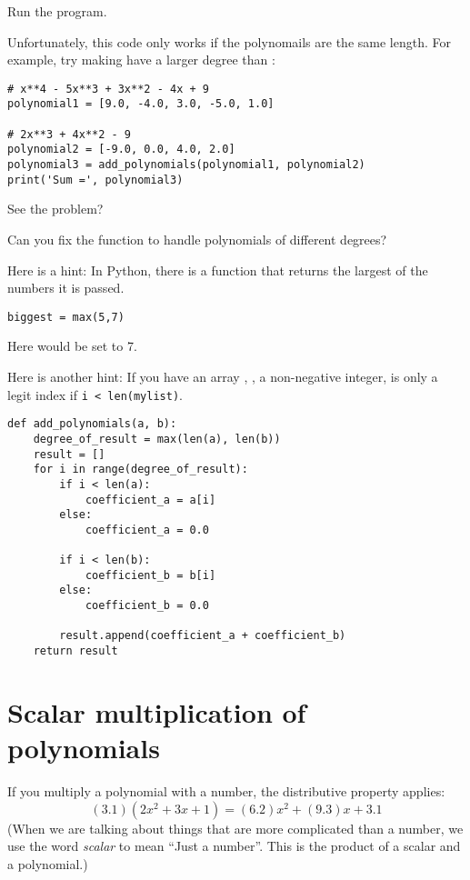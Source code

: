 Run the program.

Unfortunately, this code only works if the polynomails are the same length. For
example, try making  have a larger degree than
:
\begin{Verbatim}
# x**4 - 5x**3 + 3x**2 - 4x + 9
polynomial1 = [9.0, -4.0, 3.0, -5.0, 1.0]
  
# 2x**3 + 4x**2 - 9  
polynomial2 = [-9.0, 0.0, 4.0, 2.0]
polynomial3 = add_polynomials(polynomial1, polynomial2)
print('Sum =', polynomial3)
\end{Verbatim}

See the problem?

\begin{Exercise}[title=Dealing with polynomials of different degrees, label=pyaddpolys]
  
Can you fix the function  to handle polynomials of different degrees?

Here is a hint: In Python, there is a  function that returns the largest of the numbers it is passed.
\begin{Verbatim}
biggest = max(5,7)
\end{Verbatim}
Here  would be set to 7.

Here is another hint: If you have an array , ,
a non-negative integer, is only a legit index if \texttt{i <
  len(mylist)}.
\end{Exercise}
\begin{Answer}[ref=pyaddpolys]
\begin{Verbatim}
def add_polynomials(a, b):
    degree_of_result = max(len(a), len(b))
    result = []
    for i in range(degree_of_result):
        if i < len(a):
            coefficient_a = a[i]
        else:
            coefficient_a = 0.0   

        if i < len(b):
            coefficient_b = b[i]
        else:
            coefficient_b = 0.0
            
        result.append(coefficient_a + coefficient_b)
    return result
\end{Verbatim}
\end{Answer}

\section{Scalar multiplication of  polynomials}

If you multiply a polynomial with a number, the distributive property applies:
\begin{equation*}
  (3.1)(2x^2 + 3x + 1) = (6.2)x^2 + (9.3)x + 3.1
\end{equation*}
(When we are talking about things that are more complicated than a number, we use the word \emph{scalar} to mean ``Just a number''. This is the product of a scalar and a polynomial.)


